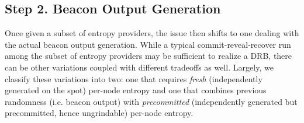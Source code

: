 \documentclass[letterpaper,twocolumn,10pt]{article}
\theoremstyle{definition}
\theoremstyle{remark}
\begin{document}
\subsection{Step 2. Beacon Output Generation}
\label{subsection:beacon-output-generation}
Once given a subset of entropy providers, the issue then shifts to one dealing with the actual beacon output generation. While a typical commit-reveal-recover run among the subset of entropy providers may be sufficient to realize a DRB, there can be other variations coupled with different tradeoffs as well. Largely, we classify these variations into two: one that requires \textit{fresh} (independently generated on the spot) per-node entropy and one that combines previous randomness (i.e. beacon output) with \textit{precommitted} (independently generated but precommitted, hence ungrindable) per-node entropy.
\end{document}
